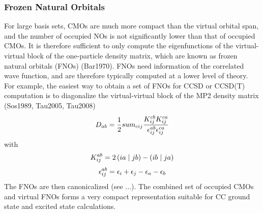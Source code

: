 
\subsubsection*{Frozen Natural Orbitals}

For large basis sets, CMOs are much more compact than the virtual orbital span, and the number of occupied NOs is not significantly lower than that of occupied CMOs. It is therefore sufficient to only compute the eigenfunctions of the virtual-virtual block of the one-particle density matrix, which are known as frozen natural orbitals (FNOs) (Bar1970). FNOs need information of the correlated wave function, and are therefore typically computed at a lower level of theory. For example, the easiest way to obtain a set of FNOs for CCSD or CCSD(T) computation is to diagonalize the virtual-virtual block  of the MP2 density matrix (Sos1989, Tau2005, Tau2008)
\begin{equation}
D_{ab} = \frac{1}{2} sum_{cij} \frac{K_{ij}^{cb} K_{ij}^{ca}}{\epsilon_{ij}^{ab} \epsilon_{ij}^{ca}}
\end{equation}
\noindent with
\begin{equation}
K_{ij}^{ab} = 2 \left( ia \mid jb \right) - \left( ib \mid ja \right)
\end{equation}
\begin{equation}
\epsilon_{ij}^{ab} = \epsilon_i + \epsilon_j - \epsilon_a - \epsilon_b 
\end{equation}
The FNOs are then canonicalized (see ...). The combined set of occupied CMOs and virtual FNOs forms a very compact representation suitable for CC ground state and excited state calculations.




